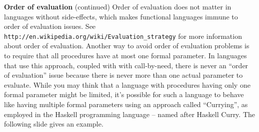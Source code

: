 \begin{minipage}[t]{\sw}
\slidenumber
\LARGE
{\bf Order of evaluation} (continued)\exx
Order of evaluation does not matter in languages without side-effects,
which makes functional languages immune to order of evaluation issues.
See \verb'http://en.wikipedia.org/wiki/Evaluation_strategy'
for more information about order of evaluation.\exx
Another way to avoid order of evaluation problems
is to require that all procedures have
at most one formal parameter.
In languages that use this approach,
coupled with with call-by-need,
there is never an ``order of evaluation'' issue
because there is never more than one actual parameter to evaluate.\exx
While you may think that a language with procedures having
only one formal parameter might be limited,
it's possible for such a language
to behave like having multiple formal parameters
using an approach called ``Currying'',
as employed in the Haskell programming language
-- named after Haskell Curry.
The following slide gives an example.
\clearpage
\end{minipage}
